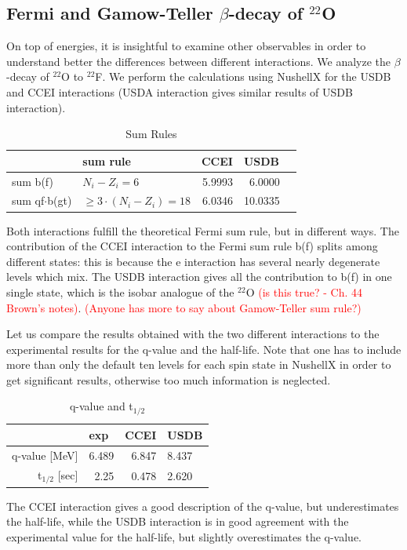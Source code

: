 \subsection{Fermi and Gamow-Teller $\beta$-decay of $^{22}$O}
%
On top of energies, it is insightful to examine other observables in order to understand better the differences between different interactions. We analyze the $\beta$-decay of $^{22}$O to $^{22}$F.
We perform the calculations using NushellX for the USDB and CCEI interactions (USDA interaction gives similar results of USDB interaction). 
\begin{table}[h!]
\caption{Sum Rules}
\begin{center}
\begin{tabular}{l@{\qquad}l@{\qquad}r@{\qquad}rl}
\hline
\multicolumn{1}{l}{\rule{0pt}{12pt}
                   }&\multicolumn{1}{l}{\rule{0pt}{12pt} sum rule}&\multicolumn{1}{l}{CCEI}&\multicolumn{2}{l}{USDB}\\[2pt]
\hline\rule{0pt}{12pt}
sum b(f)            &  $N_i-Z_i=6$   & 5.9993 & 6.0000 &\\
sum qf$\cdot$b(gt)  &  $\ge 3\cdot(N_i-Z_i)=18$  & 6.0346 & 10.0335 &\\[2pt]
\hline
\end{tabular}
\end{center}
\end{table}

Both interactions fulfill the theoretical Fermi sum rule, but in different ways.
The contribution of the CCEI interaction to the Fermi sum rule b(f) splits among different states: this is because the e interaction has several nearly degenerate levels which mix. The USDB interaction gives all the contribution to b(f) in one single state, which is the isobar analogue of the $^{22}$O \textcolor{red}{(is this true? - Ch. 44 Brown's notes)}. 
\textcolor{red}{(Anyone has more to say about Gamow-Teller sum rule?)}

Let us compare the results obtained with the two different interactions to the experimental results for the q-value and the half-life. Note that one has to include more than only the default ten levels for each spin state in NushellX in order to get significant results, otherwise too much information is neglected.
\begin{table}[h!]
\caption{q-value and t$_{1/2}$}
\begin{center}
\begin{tabular}{r@{\qquad}r@{\qquad}r@{\qquad}r@{\qquad}l}
\hline
\multicolumn{1}{l}{\rule{0pt}{12pt}
                   }&\multicolumn{1}{l}{exp}&\multicolumn{1}{l}{CCEI}&\multicolumn{2}{l}{USDB}\\[2pt]
\hline\rule{0pt}{12pt}
q-value [MeV]   &     6.489 & 6.847 & 8.437 &\\
t$_{1/2}$ [sec] &     2.25  & 0.478 & 2.620 &\\[2pt]
\hline
\end{tabular}
\end{center}
\end{table}

The CCEI interaction gives a good description of the q-value, but underestimates the half-life, while the USDB interaction is in good agreement with the experimental value for the half-life, but slightly overestimates the q-value.
